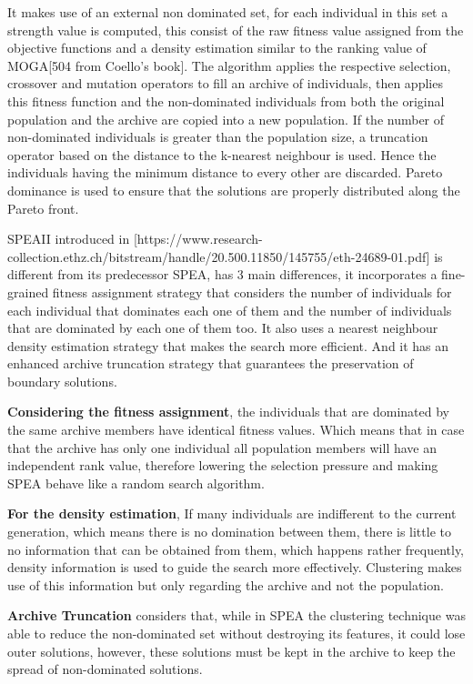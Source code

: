 It makes use of an external non dominated set, for each individual in this set a strength value is computed, this consist of the raw fitness value assigned from the objective functions and a density estimation similar to the ranking value of MOGA[504 from Coello's book]. The algorithm applies the respective selection, crossover and mutation operators to fill an archive of individuals, then applies this fitness function and the non-dominated individuals from both the original population and the archive are copied into a new population. If the number of non-dominated individuals is greater than the population size, a truncation operator based on the distance to the k-nearest neighbour is used. Hence the individuals having the minimum distance to every other are discarded. Pareto dominance is used to ensure that the solutions are properly distributed along the Pareto front.

SPEAII introduced in [https://www.research-collection.ethz.ch/bitstream/handle/20.500.11850/145755/eth-24689-01.pdf] is different from its predecessor SPEA, has 3 main differences, it incorporates a fine-grained fitness assignment strategy that considers the number of individuals for each individual that dominates each one of them and the number of individuals that are dominated by each one of them too. It also uses a nearest neighbour density estimation strategy that makes the search more efficient. And it has an enhanced archive truncation strategy that guarantees the preservation of boundary solutions.

\textbf{Considering the fitness assignment}, the individuals that are dominated by the same archive members have identical fitness values. Which means that in case that the archive has only one individual all population members will have an independent rank value, therefore lowering the selection pressure and making SPEA behave like a random search algorithm.

\textbf{For the density estimation}, If many individuals are indifferent to the current generation, which means there is no domination between them, there is little to no information that can be obtained from them, which happens rather frequently, density information is used to guide the search more effectively. Clustering makes use of this information but only regarding the archive and not the population.

\textbf{Archive Truncation} considers that, while in SPEA the clustering technique was able to reduce the non-dominated set without destroying its features, it could lose outer solutions, however, these solutions must be kept in the archive to keep the spread of non-dominated solutions.

